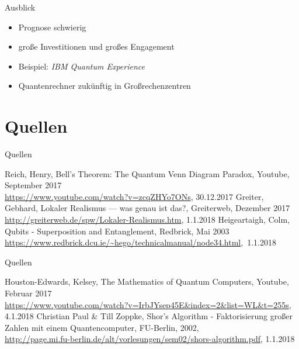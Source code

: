 \documentclass[]{beamer}
\begin{document}
\begin{frame}{Ausblick}
\begin{center}
	\begin{itemize}
	\item Prognose schwierig
    \item große Investitionen und großes Engagement
    \item Beispiel: \textit{IBM Quantum Experience}
    \item Quantenrechner zukünftig in Großrechenzentren
	\end{itemize}
\end{center}
\end{frame}


\section{Quellen}

\begin{frame}{Quellen}
\begin{thebibliography}{9}
\footnotesize Reich, Henry, Bell's Theorem: The Quantum Venn Diagram Paradox, Youtube, September 2017
\\\url{https://www.youtube.com/watch?v=zcqZHYo7ONs}, 30.12.2017
\footnotesize Greiter, Gebhard, Lokaler Realismus — was genau ist das?, Greiterweb, Dezember 2017
\\\url{http://greiterweb.de/spw/Lokaler-Realismus.htm}, 1.1.2018
\footnotesize Heigeartaigh, Colm, Qubits - Superposition and Entanglement, Redbrick, Mai 2003
\\\url{https://www.redbrick.dcu.ie/~hego/technicalmanual/node34.html},~1.1.2018

\end{thebibliography}
\end{frame}

\begin{frame}{Quellen}
\begin{thebibliography}{9}

\footnotesize Houston-Edwards, Kelsey, The Mathematics of Quantum Computers, Youtube, Februar 2017
\\ \url{https://www.youtube.com/watch?v=IrbJYsep45E&index=2&list=WL&t=255s}, 4.1.2018
\footnotesize Christian Paul \& Till Zoppke, Shor's Algorithm - Faktorisierung großer Zahlen mit einem Quantencomputer, FU-Berlin, 2002, \\ \url{http://page.mi.fu-berlin.de/alt/vorlesungen/sem02/shors-algorithm.pdf}, 1.1.2018

\end{thebibliography}
\end{frame}

\frame{\titlepage}
\end{document}
